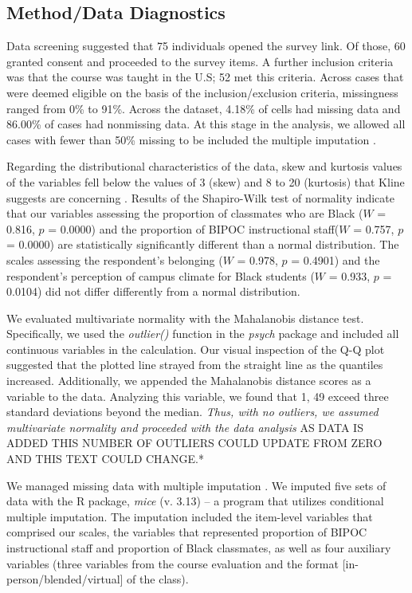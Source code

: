 \documentclass[
]{book}
\begin{document}
\hypertarget{methoddata-diagnostics}{%
\subsection{Method/Data Diagnostics}\label{methoddata-diagnostics}}

Data screening suggested that 75 individuals opened the survey link. Of those, 60 granted consent and proceeded to the survey items. A further inclusion criteria was that the course was taught in the U.S; 52 met this criteria. Across cases that were deemed eligible on the basis of the inclusion/exclusion criteria, missingness ranged from 0\% to 91\%. Across the dataset, 4.18\% of cells had missing data and 86.00\% of cases had nonmissing data. At this stage in the analysis, we allowed all cases with fewer than 50\% missing to be included the multiple imputation \citep{katitas_getting_2019}.

Regarding the distributional characteristics of the data, skew and kurtosis values of the variables fell below the values of 3 (skew) and 8 to 20 (kurtosis) that Kline suggests are concerning \citeyearpar{kline_principles_2016}. Results of the Shapiro-Wilk test of normality indicate that our variables assessing the proportion of classmates who are Black (\(W\) = 0.816, \(p\) = 0.0000) and the proportion of BIPOC instructional staff(\(W\) = 0.757, \(p\) = 0.0000) are statistically significantly different than a normal distribution. The scales assessing the respondent's belonging (\(W\) = 0.978, \(p\) = 0.4901) and the respondent's perception of campus climate for Black students (\(W\) = 0.933, \(p\) = 0.0104) did not differ differently from a normal distribution.

We evaluated multivariate normality with the Mahalanobis distance test. Specifically, we used the \emph{outlier()} function in the \emph{psych} package and included all continuous variables in the calculation. Our visual inspection of the Q-Q plot suggested that the plotted line strayed from the straight line as the quantiles increased. Additionally, we appended the Mahalanobis distance scores as a variable to the data. Analyzing this variable, we found that 1, 49 exceed three standard deviations beyond the median. \emph{Thus, with no outliers, we assumed multivariate normality and proceeded with the data analysis} AS DATA IS ADDED THIS NUMBER OF OUTLIERS COULD UPDATE FROM ZERO AND THIS TEXT COULD CHANGE.*

We managed missing data with multiple imputation \citep{enders_multiple_2017, katitas_getting_2019}. We imputed five sets of data with the R package, \emph{mice} (v. 3.13) -- a program that utilizes conditional multiple imputation. The imputation included the item-level variables that comprised our scales, the variables that represented proportion of BIPOC instructional staff and proportion of Black classmates, as well as four auxiliary variables (three variables from the course evaluation and the format {[}in-person/blended/virtual{]} of the class).
\end{document}
